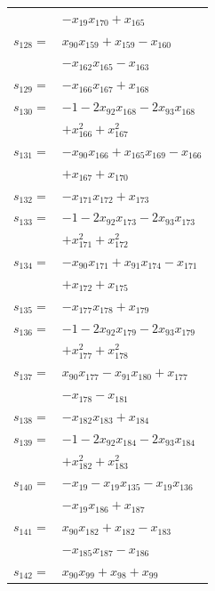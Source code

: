 \begin{longtable}{@{}r@{\;}l@{}}
 & \(\displaystyle -x_{19}x_{170} +x_{165}\) \\[3pt]
\(s_{128}=\) & \(\displaystyle x_{90}x_{159} +x_{159} -x_{160}\) \\
 & \(\displaystyle -x_{162}x_{165} -x_{163}\) \\[3pt]
\(s_{129}=\) & \(\displaystyle -x_{166}x_{167} +x_{168}\) \\[3pt]
\(s_{130}=\) & \(\displaystyle -1 -2x_{92}x_{168} -2x_{93}x_{168}\) \\
 & \(\displaystyle +x_{166}^{2} +x_{167}^{2}\) \\[3pt]
\(s_{131}=\) & \(\displaystyle -x_{90}x_{166} +x_{165}x_{169} -x_{166}\) \\
 & \(\displaystyle +x_{167} +x_{170}\) \\[3pt]
\(s_{132}=\) & \(\displaystyle -x_{171}x_{172} +x_{173}\) \\[3pt]
\(s_{133}=\) & \(\displaystyle -1 -2x_{92}x_{173} -2x_{93}x_{173}\) \\
 & \(\displaystyle +x_{171}^{2} +x_{172}^{2}\) \\[3pt]
\(s_{134}=\) & \(\displaystyle -x_{90}x_{171} +x_{91}x_{174} -x_{171}\) \\
 & \(\displaystyle +x_{172} +x_{175}\) \\[3pt]
\(s_{135}=\) & \(\displaystyle -x_{177}x_{178} +x_{179}\) \\[3pt]
\(s_{136}=\) & \(\displaystyle -1 -2x_{92}x_{179} -2x_{93}x_{179}\) \\
 & \(\displaystyle +x_{177}^{2} +x_{178}^{2}\) \\[3pt]
\(s_{137}=\) & \(\displaystyle x_{90}x_{177} -x_{91}x_{180} +x_{177}\) \\
 & \(\displaystyle -x_{178} -x_{181}\) \\[3pt]
\(s_{138}=\) & \(\displaystyle -x_{182}x_{183} +x_{184}\) \\[3pt]
\(s_{139}=\) & \(\displaystyle -1 -2x_{92}x_{184} -2x_{93}x_{184}\) \\
 & \(\displaystyle +x_{182}^{2} +x_{183}^{2}\) \\[3pt]
\(s_{140}=\) & \(\displaystyle -x_{19} -x_{19}x_{135} -x_{19}x_{136}\) \\
 & \(\displaystyle -x_{19}x_{186} +x_{187}\) \\[3pt]
\(s_{141}=\) & \(\displaystyle x_{90}x_{182} +x_{182} -x_{183}\) \\
 & \(\displaystyle -x_{185}x_{187} -x_{186}\) \\[3pt]
\(s_{142}=\) & \(\displaystyle x_{90}x_{99} +x_{98} +x_{99}\) \\

\end{longtable}
